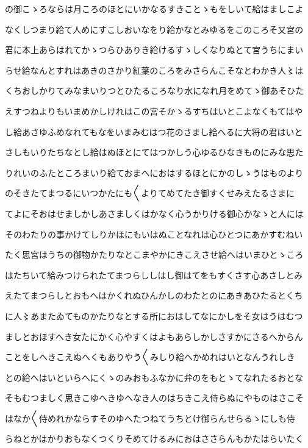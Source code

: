 \documentclass[a4paper,11pt,landscape]{ltjtarticle}
\begin{document}
の御こゝろならは月ころのほとにいかなるすきことゝもをしいて給はましこよ
\par\medskip
なくしつまり給て人めにすこしおいなをり給かなとみゆるをこのころそ又宮の
\par\medskip
君に本上あらはれてかゝつらひありき給けるすゝしくなりぬとて宮うちにまい
\par\medskip
らせ給なんとすれはあきのさかり紅葉のころをみさらんこそなとわかき人〻は
\par\medskip
くちおしかりてみなまいりつとひたるころなり水になれ月をめてゝ御あそひた
\par\medskip
えすつねよりもいまめかしけれはこの宮そかゝるすちはいとこよなくもてはや
\par\medskip
し給あさゆふめなれてもなをいまみむはつ花のさまし給へるに大将の君はいと
\par\medskip
さしもいりたちなとし給はぬほとにてはつかしう心ゆるひなきものにみな思た
\par\medskip
りれいのふたところまいり給ておまへにおはするほとにかのしゝうはものより
\par\medskip
のそきたてまつるにいつかたにも〱よりてめてたき御すくせみえたるさまに
\par\medskip
てよにそおはせましかしあさましくはかなく心うかりける御心かなゝと人には
\par\medskip
そのわたりの事かけてしりかほにもいはぬことなれは心ひとつにあかすむねい
\par\medskip
たく思宮はうちの御物かたりなとこまやかにきこえさせ給へはいまひとゝころ
\par\medskip
はたちいて給みつけられたてまつらししはし御はてをもすくさす心あさしとみ
\par\medskip
えたてまつらしとおもへはかくれぬひんかしのわたとのにあきあひたるとくち
\par\medskip
に人〻あまたゐてものかたりなとする所におはしてなにかしをそ女はうはむつ
\par\medskip
ましとおほすへき女たにかく心やすくはよもあらしかしさすかにさるへからん
\par\medskip
ことをしへきこえぬへくもありやう〱みしり給へかめれはいとなんうれしき
\par\medskip
との給へはいといらへにくゝのみおもふなかに弁のをもとゝてなれたるおとな
\par\medskip
そもむつましく思きこゆへきゆへなき人のはちきこえ侍らぬにやものはさこそ
\par\medskip
はなか〱侍めれかならすそのゆへたつねてうちとけ御らんせらるゝにしも侍
\par\medskip
らねとかはかりおもなくつくりそめてけるみにおはささらんもかたはらいたく
\end{document}
